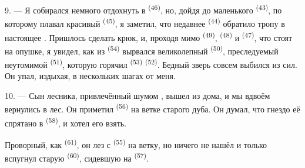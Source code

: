 9. --- Я собирался немного отдохнуть в 
\textsuperscript{(46)}, но, дойдя до маленького  \textsuperscript{(43)},
по которому плавал красивый  \textsuperscript{(45)}, я заметил, что
недавнее  \textsuperscript{(44)} обратило тропу в настоящее
. Пришлось сделать крюк, и, проходя мимо 
\textsuperscript{(49)},  \textsuperscript{(48)} и 
\textsuperscript{(47)}, что стоят на опушке, я увидел, как из 
\textsuperscript{(54)} вырвался великолепный 
\textsuperscript{(50)}, преследуемый неутомимой  \textsuperscript{(51)}, которую горячил
 \textsuperscript{(53)}  \textsuperscript{(52)}.
Бедный зверь совсем выбился из сил. Он упал, издыхая, в нескольких шагах
от меня.

10. --- Сын лесника, привлечённый шумом , вышел из дома, и мы
вдвоём вернулись в лес. Он приметил  \textsuperscript{(56)} на
ветке старого дуба. Он думал, что гнездо её спрятано в 
\textsuperscript{(58)}, и хотел его взять.

Проворный, как  \textsuperscript{(61)}, он лез с 
\textsuperscript{(55)} на ветку, но ничего не нашёл и только вспугнул старую
 \textsuperscript{(60)}, сидевшую на  \textsuperscript{(57)}.
\VUsaut{4.0mm}
\VUfilet{22mm}
